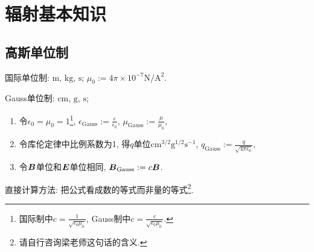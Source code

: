 \chapter{辐射基本知识}

\section{高斯单位制}

国际单位制: $\text{m}$, $\text{kg}$, $\text{s}$; $\mu_0:=4\pi\times10^{-7}\text{N}/\text{A}^2$.

Gauss单位制: $\text{cm}$, $\text{g}$, $\text{s}$;
\begin{enumerate}
    \item 令$\epsilon_0=\mu_0=1$\footnote{国际制中$c=\frac{1}{\sqrt{\epsilon_0\mu_0}}$, Gauss制中$c=\frac{c}{\sqrt{\epsilon_0\mu_0}}$.},
    $\epsilon_\text{Gauss}:=\frac{\epsilon}{\epsilon_0}$,
    $\mu_\text{Gauss}:=\frac{\mu}{\mu_0}$,
    \item 令库伦定律中比例系数为1, 得$q$单位$\text{cm}^{3/2}\text{g}^{1/2}\text{s}^{-1}$,
    $q_\text{Gauss}:=\frac{q}{\sqrt{4\pi\epsilon_0}}$,
    \item 令$\boldsymbol{B}$单位和$\boldsymbol{E}$单位相同,
    $\boldsymbol{B}_\text{Gauss}:=c\boldsymbol{B}$.
\end{enumerate}
直接计算方法: 把公式看成数的等式而非量的等式\footnote{请自行咨询梁老师这句话的含义.}.
